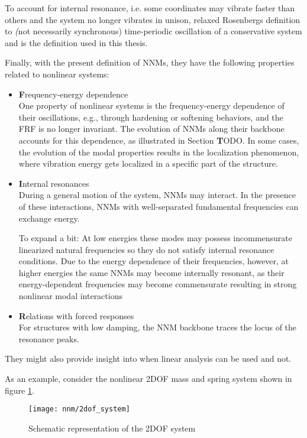 To account for internal resonance, i.e. some coordinates may vibrate faster than
others and the system no longer vibrates in unison, \citep{kerschen2009a}
relaxed Rosenbergs definition to {\textit (not necessarily synchronous)
  time-periodic oscillation of a conservative system} and is the definition used
in this thesis.


Finally, with the present definition of NNMs, they have the following properties
related to nonlinear systems:

\begin{itemize}
\item {\textbf Frequency-energy dependence}\\
  One property of nonlinear systems is the frequency-energy dependence of their
  oscillations, e.g., through hardening or softening behaviors, and the FRF is
  no longer invariant.
  The evolution of NNMs along their backbone accounts for this dependence, as
  illustrated in Section {\textbf TODO}. In some cases, the evolution of the modal
  properties results in the localization phenomenon, where vibration energy gets
  localized in a specific part of the structure.
\item {\textbf Internal resonances}\\
  During a general motion of the system, NNMs may interact. In the presence of
  these interactions, NNMs with well-separated fundamental frequencies can
  exchange energy.

  To expand a bit: At low energies these modes may possess incommensurate
  linearized natural frequencies so they do not satisfy internal resonance
  conditions. Due to the energy dependence of their frequencies, however, at
  higher energies the same NNMs may become internally resonant, as their
  energy-dependent frequencies may become commensurate resulting in strong
  nonlinear modal interactions
\item {\textbf Relations with forced responses}\\
  For structures with low damping, the NNM backbone traces the locus of the
  resonance peaks.
\end{itemize}

They might also provide insight into when linear analysis can be used and not.



As an example, consider the nonlinear 2DOF mass and spring system shown in
figure \ref{fig:2dof_system}.

\begin{figure}[!ht]
  \centering
  \texttt{[image: nnm/2dof\_system]}
  \caption{Schematic representation of the 2DOF system}
  \label{fig:2dof_system}
\end{figure}

